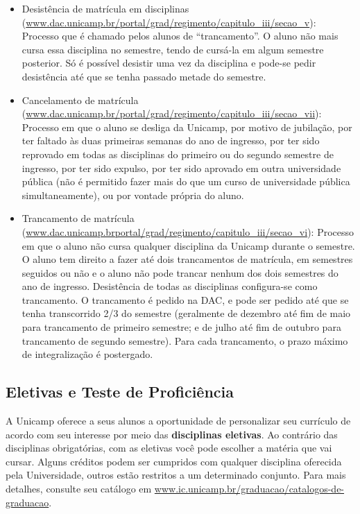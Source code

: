 \begin{itemize}
    \item Desistência de matrícula em disciplinas
        (\url{www.dac.unicamp.br/portal/grad/regimento/capitulo_iii/secao_v}):
        Processo que é chamado pelos alunos de ``trancamento''.  O aluno não
        mais cursa essa disciplina no semestre, tendo de cursá-la em algum
        semestre posterior. Só é possível desistir uma vez da disciplina e
        pode-se pedir desistência até que se tenha passado metade do semestre.
    \item Cancelamento de matrícula
        (\url{www.dac.unicamp.br/portal/grad/regimento/capitulo_iii/secao_vii}):
        Processo em que o aluno se desliga da Unicamp, por motivo de jubilação,
        por ter faltado às duas primeiras semanas do ano de ingresso, por ter
        sido reprovado em todas as disciplinas do primeiro ou do segundo
        semestre de ingresso, por ter sido expulso, por ter sido aprovado em
        outra universidade pública (não é permitido fazer mais do que um curso
        de universidade pública simultaneamente), ou por vontade própria do
        aluno.
    \item Trancamento de matrícula
        (\url{www.dac.unicamp.brportal/grad/regimento/capitulo_iii/secao_vi}):
        Processo em que o aluno não cursa qualquer disciplina da Unicamp durante
        o semestre. O aluno tem direito a fazer até dois trancamentos de
        matrícula, em semestres seguidos ou não e o aluno não pode trancar
        nenhum dos dois semestres do ano de ingresso. Desistência de todas as
        disciplinas configura-se como trancamento. O trancamento é pedido na
        DAC, e pode ser pedido até que se tenha transcorrido 2/3 do semestre
        (geralmente de dezembro até fim de maio para trancamento de primeiro
        semestre; e de julho até fim de outubro para trancamento de segundo
        semestre). Para cada trancamento, o prazo máximo de integralização é
        postergado.
\end{itemize}

\subsection{Eletivas e Teste de Proficiência}

A Unicamp oferece a seus alunos a oportunidade de personalizar seu currículo de
acordo com seu interesse por meio das \textbf{disciplinas eletivas}. Ao
contrário das disciplinas obrigatórias, com as eletivas você pode escolher a
matéria que vai cursar. Alguns créditos podem ser cumpridos com qualquer
disciplina oferecida pela Universidade, outros estão restritos a um determinado
conjunto. Para mais detalhes, consulte seu catálogo em
\url{www.ic.unicamp.br/graduacao/catalogos-de-graduacao}.

